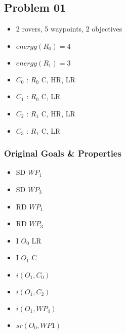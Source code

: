 \subsection*{Problem 01}

\begin{itemize}
	\item 2 rovers, 5 waypoints, 2 objectives
	\item $energy(R_0) = 4$
	\item $energy(R_1) = 3$
	\item $C_0$ : $R_0$ C, HR, LR
	\item $C_1$ : $R_0$ C, LR
	\item $C_2$ : $R_1$ C, HR, LR
	\item $C_3$ : $R_1$ C, LR
\end{itemize}

\subsubsection*{Original Goals \& Properties}
\begin{minipage}[t]{0.45\textwidth}
	\begin{itemize}
		\item SD $WP_1$
		\item SD $WP_3$
		\item RD $WP_1$
		\item RD $WP_3$
		\item I $O_0$ LR
		\item I $O_1$ C
	\end{itemize}
\end{minipage}
\begin{minipage}[t]{0.45\textwidth}
	\begin{itemize}
		\item $i(O_1, C_0)$
		\item $i(O_1, C_2)$
		\item $i(O_1, WP_4)$
		\item $sr(O_0, WP1)$
	\end{itemize}
\end{minipage}


